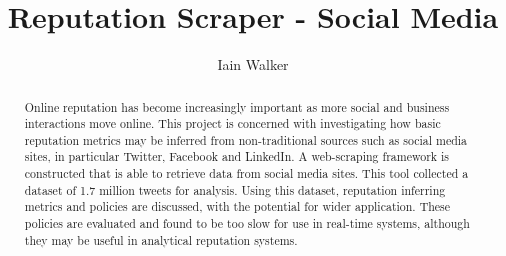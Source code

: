 \documentclass[11pt
              , a4paper
              , twoside
              , openright
              ]{report}
\title{Reputation Scraper - Social Media}
\author{Iain Walker}
\date{}
\begin{document}
\frontmatter



\begin{abstract}

Online reputation has become increasingly important as more social and business interactions move online. This project is concerned with investigating how basic reputation metrics may be inferred from non-traditional sources such as social media sites, in particular Twitter, Facebook and LinkedIn. A web-scraping framework is constructed that is able to retrieve data from social media sites. This tool collected a dataset of 1.7 million tweets for analysis. Using this dataset, reputation inferring metrics and policies are discussed, with the potential for wider application. These policies are evaluated and found to be too slow for use in real-time systems, although they may be useful in analytical reputation systems. 


\end{abstract}


\maketitle



\tableofcontents


\end{document}
